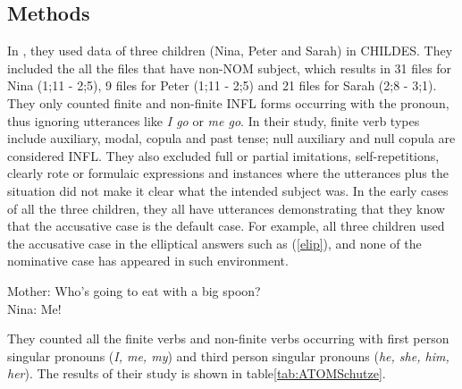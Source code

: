 \subsection{Methods}
In \cite{schutze1996subject}, they used data of three children (Nina, Peter and Sarah) in CHILDES. They included the all the files that have non-NOM subject, which results in 31 files for Nina (1;11 - 2;5), 9 files for Peter (1;11 - 2;5) and 21 files for Sarah (2;8 - 3;1). They only counted finite and non-finite INFL forms occurring with the pronoun, thus ignoring utterances like \textit{I go} or \textit{me go}. In their study, finite verb types include auxiliary, modal, copula and past tense; null auxiliary and null copula are considered INFL. They also excluded full or partial imitations, self-repetitions, clearly rote or formulaic expressions and instances where the utterances plus the situation did not make it clear what the intended subject was. 
In the early cases of all the three children, they all have utterances demonstrating that they know that the accusative case is the default case. For example, all three children used the accusative case in the elliptical answers such as (\ref{elip}), and none of the nominative case has appeared in such environment.
\begin{exe}
\ex \label{elip} Mother: Who's going to eat with a big spoon?\\
Nina: Me!
\end{exe}
They counted all the finite verbs and non-finite verbs occurring with first person singular pronouns (\textit{I, me, my}) and third person singular pronouns (\textit{he, she, him, her}). The results of their study is shown in table\ref{tab:ATOMSchutze}. 
